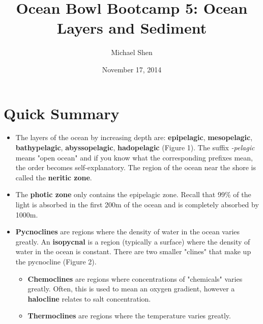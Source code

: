 \documentclass{article}
\begin{document}
\title{Ocean Bowl Bootcamp 5: Ocean Layers and Sediment}
\author{Michael Shen}
\date{November 17, 2014}
\maketitle

\section{Quick Summary}

\begin{itemize}
	\item The layers of the ocean by increasing depth are: \textbf{epipelagic}, \textbf{mesopelagic}, \textbf{bathypelagic}, \textbf{abyssopelagic}, \textbf{hadopelagic} (Figure 1). The suffix \textit{-pelagic} means "open ocean" and if you know what the corresponding prefixes mean, the order becomes self-explanatory. The region of the ocean near the shore is called the \textbf{neritic zone}.
	
	\item The \textbf{photic zone} only contains the epipelagic zone. Recall that 99\% of the light is absorbed in the first 200m of the ocean and is completely absorbed by 1000m.
	
	\item \textbf{Pycnoclines} are regions where the density of water in the ocean varies greatly. An \textbf{isopycnal} is a region (typically a surface) where the density of water in the ocean is constant. There are two smaller "clines" that make up the pycnocline (Figure 2).
	\begin{itemize}
		\item \textbf{Chemoclines} are regions where concentrations of "chemicals" varies greatly. Often, this is used to mean an oxygen gradient, however a \textbf{halocline} relates to salt concentration.
		\item \textbf{Thermoclines} are regions where the temperature varies greatly.
	\end{itemize}
	

\end{itemize}
\end{document}
